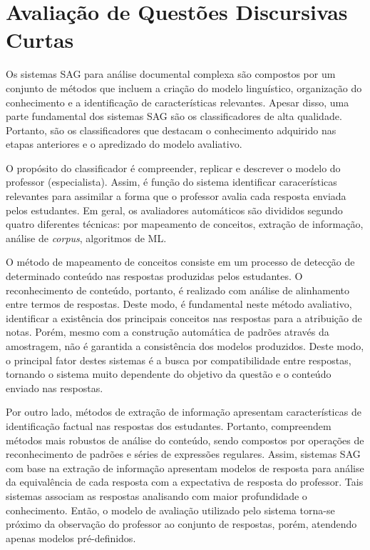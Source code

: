 \section{Avaliação de Questões Discursivas Curtas}

Os sistemas SAG para análise documental complexa são compostos por um conjunto de métodos que incluem a criação do modelo linguístico, organização do conhecimento e a identificação de características relevantes. Apesar disso, uma parte fundamental dos sistemas SAG são os classificadores de alta qualidade. Portanto, são os classificadores que destacam o conhecimento adquirido nas etapas anteriores e o apredizado do modelo avaliativo.

O propósito do classificador é compreender, replicar e descrever o modelo do professor (especialista). Assim, é função do sistema identificar caracerísticas relevantes para assimilar a forma que o professor avalia cada resposta enviada pelos estudantes. Em geral, os avaliadores automáticos são divididos segundo quatro diferentes técnicas: por mapeamento de conceitos, extração de informação, análise de \textit{corpus}, algoritmos de ML. 

O método de mapeamento de conceitos consiste em um processo de detecção de determinado conteúdo nas respostas produzidas pelos estudantes. O reconhecimento de conteúdo, portanto, é realizado com análise de alinhamento entre termos de respostas. Deste modo, é fundamental neste método avaliativo, identificar a existência dos principais conceitos nas respostas para a atribuição de notas. Porém, mesmo com a construção automática de padrões através da amostragem, não é garantida a consistência dos modelos produzidos. Deste modo, o principal fator destes sistemas é a busca por compatibilidade entre respostas, tornando o sistema muito dependente do objetivo da questão e o conteúdo enviado nas respostas.

Por outro lado, métodos de extração de informação apresentam características de identificação factual nas respostas dos estudantes. Portanto, compreendem métodos mais robustos de análise do conteúdo, sendo compostos por operações de reconhecimento de padrões e séries de expressões regulares. Assim, sistemas SAG com base na extração de informação apresentam modelos de resposta para análise da equivalência de cada resposta com a expectativa de resposta do professor. Tais sistemas associam as respostas analisando com maior profundidade o conhecimento. Então, o modelo de avaliação utilizado pelo sistema torna-se próximo da observação do professor ao conjunto de respostas, porém, atendendo apenas modelos pré-definidos.

